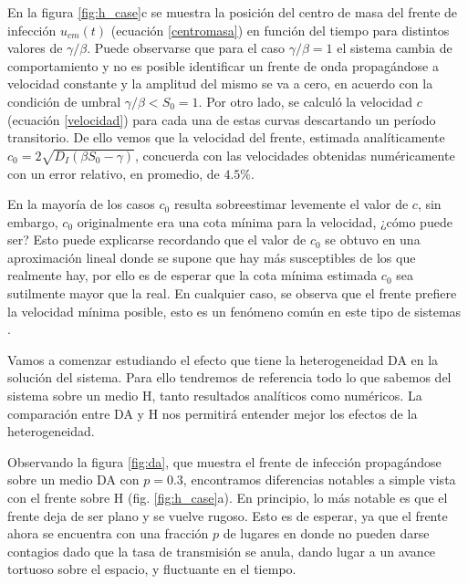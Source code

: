 En la figura \ref{fig:h_case}c se muestra la posición del centro de masa del frente de infección $u_{cm}(t)$ (ecuación \ref{centromasa}) en función del tiempo para distintos valores de $\gamma/\beta$. Puede observarse 
que para el caso $\gamma/\beta=1$ el sistema cambia de comportamiento y no es posible identificar un frente de onda propagándose a velocidad constante y la amplitud del mismo se va a cero, en acuerdo con la condición de umbral $\gamma/\beta<S_0=1$. Por otro lado, se calculó la velocidad $c$ (ecuación \ref{velocidad}) para cada una de estas curvas descartando un período transitorio. De ello vemos que la velocidad del frente, estimada analíticamente $c_0 = 2\sqrt{D_I(\beta S_0-\gamma)}$, concuerda 
con las velocidades obtenidas numéricamente con un error relativo, en promedio, de $4.5\%$. 

En la mayoría de los casos $c_0$ resulta sobreestimar levemente el valor de $c$, sin embargo, $c_0$ originalmente era una cota mínima para la velocidad, ¿cómo puede ser? Esto puede explicarse recordando que el valor de $c_0$ se obtuvo en una aproximación lineal donde se supone que hay más susceptibles de los que realmente hay, por ello es de esperar que la cota mínima estimada $c_0$ sea sutilmente mayor que la real. En cualquier caso, se observa que el frente prefiere la velocidad mínima posible, esto es un fenómeno común en este tipo de sistemas \cite{Murray2002}.




Vamos a comenzar estudiando el efecto que tiene la heterogeneidad DA en la solución del sistema. Para ello tendremos de referencia todo lo que sabemos del sistema sobre un medio H, tanto resultados analíticos como numéricos. La comparación entre DA y H nos permitirá entender mejor los efectos de la heterogeneidad.

Observando la figura \ref{fig:da}, que muestra el frente de infección propagándose sobre un medio DA con $p=0.3$, encontramos diferencias notables a simple vista con el frente sobre H (fig. \ref{fig:h_case}a). En principio, lo más notable es que el frente deja de ser plano y se vuelve rugoso. Esto es de esperar, ya que el frente ahora se encuentra con una fracción $p$ de lugares en donde no pueden darse contagios dado que la tasa de transmisión se anula, dando lugar a un avance tortuoso sobre el espacio, y fluctuante en el tiempo.

